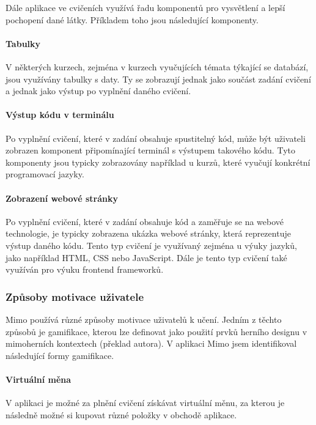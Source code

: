 Dále aplikace ve cvičeních využívá řadu komponentů pro vysvětlení a lepší pochopení dané látky. Příkladem toho jsou následující komponenty.

\paragraph{Tabulky} V některých kurzech, zejména v kurzech vyučujících témata týkající se databází, jsou využívány tabulky s daty. Ty se zobrazují jednak jako součást zadání cvičení a jednak jako výstup po vyplnění daného cvičení.

\paragraph{Výstup kódu v terminálu} Po vyplnění cvičení, které v zadání obsahuje spustitelný kód, může být uživateli zobrazen komponent připomínající terminál s výstupem takového kódu. Tyto komponenty jsou typicky zobrazovány například u kurzů, které vyučují konkrétní programovací jazyky.

\paragraph{Zobrazení webové stránky} Po vyplnění cvičení, které v zadání obsahuje kód a zaměřuje se na webové technologie, je typicky zobrazena ukázka webové stránky, která reprezentuje výstup daného kódu. Tento typ cvičení je využívaný zejména u výuky jazyků, jako například HTML, CSS nebo JavaScript. Dále je tento typ cvičení také využíván pro výuku frontend frameworků.

\subsubsection{Způsoby motivace uživatele}

Mimo používá různé způsoby motivace uživatelů k učení. Jedním z těchto způsobů je gamifikace, kterou lze definovat jako použití prvků herního designu v mimoherních kontextech \cite{10.1145/2181037.2181040} (překlad autora). V aplikaci Mimo jsem identifikoval následující formy gamifikace.

\paragraph{Virtuální měna} V aplikaci je možné za plnění cvičení získávat virtuální měnu, za kterou je následně možné si kupovat různé položky v obchodě aplikace.


